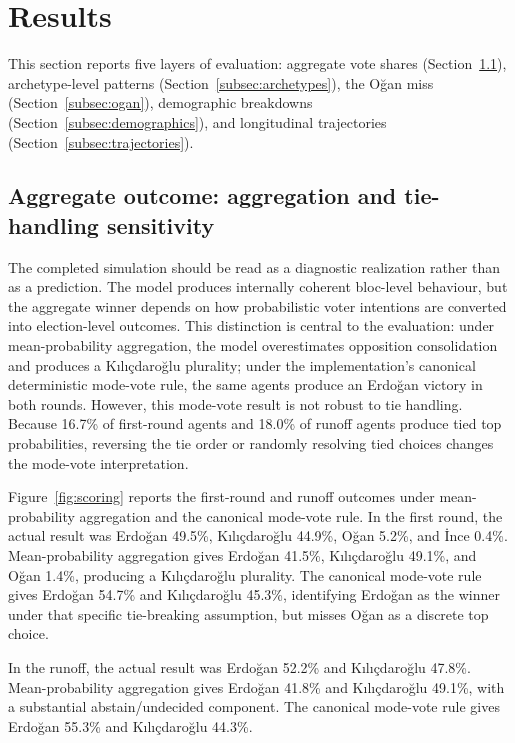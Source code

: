 \documentclass[pdflatex,sn-mathphys-num,iicol]{sn-jnl}
\begin{document}
\section{Results}\label{sec:results}

This section reports five layers of evaluation: aggregate vote shares (Section~\ref{subsec:two_rules}), archetype-level patterns (Section~\ref{subsec:archetypes}), the Oğan miss (Section~\ref{subsec:ogan}), demographic breakdowns (Section~\ref{subsec:demographics}), and longitudinal trajectories (Section~\ref{subsec:trajectories}).

\subsection{Aggregate outcome: aggregation and tie-handling sensitivity}\label{subsec:two_rules}

The completed simulation should be read as a diagnostic realization rather than as a prediction. The model produces internally coherent bloc-level behaviour, but the aggregate winner depends on how probabilistic voter intentions are converted into election-level outcomes. This distinction is central to the evaluation: under mean-probability aggregation, the model overestimates opposition consolidation and produces a Kılıçdaroğlu plurality; under the implementation's canonical deterministic mode-vote rule, the same agents produce an Erdoğan victory in both rounds. However, this mode-vote result is not robust to tie handling. Because 16.7\% of first-round agents and 18.0\% of runoff agents produce tied top probabilities, reversing the tie order or randomly resolving tied choices changes the mode-vote interpretation.

Figure~\ref{fig:scoring} reports the first-round and runoff outcomes under mean-probability aggregation and the canonical mode-vote rule. In the first round, the actual result was Erdoğan 49.5\%, Kılıçdaroğlu 44.9\%, Oğan 5.2\%, and İnce 0.4\%. Mean-probability aggregation gives Erdoğan 41.5\%, Kılıçdaroğlu 49.1\%, and Oğan 1.4\%, producing a Kılıçdaroğlu plurality. The canonical mode-vote rule gives Erdoğan 54.7\% and Kılıçdaroğlu 45.3\%, identifying Erdoğan as the winner under that specific tie-breaking assumption, but misses Oğan as a discrete top choice.

In the runoff, the actual result was Erdoğan 52.2\% and Kılıçdaroğlu 47.8\%. Mean-probability aggregation gives Erdoğan 41.8\% and Kılıçdaroğlu 49.1\%, with a substantial abstain/undecided component. The canonical mode-vote rule gives Erdoğan 55.3\% and Kılıçdaroğlu 44.3\%.
\end{document}
